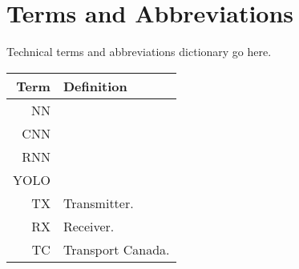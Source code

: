 \thispagestyle{empty}

\section*{Terms and Abbreviations}

Technical terms and abbreviations dictionary go here.

\begin{tabular}[h]{rl}
    \hline
    \textbf{Term} & \textbf{Definition}\\
    \hline

    NN &\\
    CNN &\\
    RNN &\\
    YOLO &\\
    TX & Transmitter.\\
    RX & Receiver.\\
    TC & Transport Canada.\\

    \hline

\end{tabular}